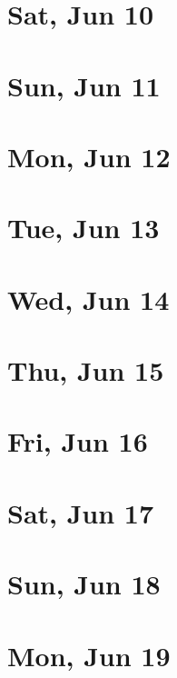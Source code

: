 	\section{Sat, Jun 10}
		
		
	\section{Sun, Jun 11}
		
		
	\section{Mon, Jun 12}
		
		
	\section{Tue, Jun 13}
		
		
	\section{Wed, Jun 14}
		
		
	\section{Thu, Jun 15}
		
		
	\section{Fri, Jun 16}
		
		
	\section{Sat, Jun 17}
		
		
	\section{Sun, Jun 18}
		
		
	\section{Mon, Jun 19}
		
		
